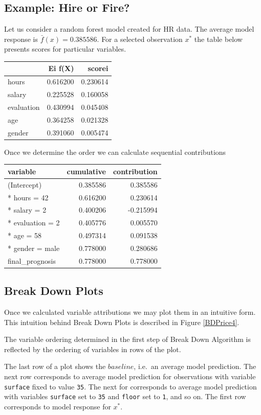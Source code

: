 \documentclass[]{krantz}
\theoremstyle{definition}
\theoremstyle{definition}
\theoremstyle{definition}
\theoremstyle{remark}
\begin{document}
\hypertarget{example-hire-or-fire}{%
\subsection{Example: Hire or Fire?}\label{example-hire-or-fire}}

Let us consider a random forest model created for HR data. The average
model response is \(\bar f(x) = 0.385586\). For a selected observation
\(x^*\) the table below presents scores for particular variables.

\begin{longtable}[]{@{}lrr@{}}
\toprule
& Ei f(X) & scorei\tabularnewline
\midrule
\endhead
hours & 0.616200 & 0.230614\tabularnewline
salary & 0.225528 & 0.160058\tabularnewline
evaluation & 0.430994 & 0.045408\tabularnewline
age & 0.364258 & 0.021328\tabularnewline
gender & 0.391060 & 0.005474\tabularnewline
\bottomrule
\end{longtable}

Once we determine the order we can calculate sequential contributions

\begin{longtable}[]{@{}lrr@{}}
\toprule
variable & cumulative & contribution\tabularnewline
\midrule
\endhead
(Intercept) & 0.385586 & 0.385586\tabularnewline
* hours = 42 & 0.616200 & 0.230614\tabularnewline
* salary = 2 & 0.400206 & -0.215994\tabularnewline
* evaluation = 2 & 0.405776 & 0.005570\tabularnewline
* age = 58 & 0.497314 & 0.091538\tabularnewline
* gender = male & 0.778000 & 0.280686\tabularnewline
final\_prognosis & 0.778000 & 0.778000\tabularnewline
\bottomrule
\end{longtable}

\hypertarget{break-down-plots}{%
\subsection{Break Down Plots}\label{break-down-plots}}

Once we calculated variable attributions we may plot them in an
intuitive form. This intuition behind Break Down Plots is described in
Figure \ref{BDPrice4}.

The variable ordering determined in the first step of Break Down
Algorithm is reflected by the ordering of variables in rows of the plot.

The last row of a plot shows the \(baseline\), i.e.~an average model
prediction. The next row corresponds to average model prediction for
observations with variable \texttt{surface} fixed to value \texttt{35}.
The next for corresponds to average model prediction with variables
\texttt{surface} set to \texttt{35} and \texttt{floor} set to
\texttt{1}, and so on. The first row corresponds to model response for
\(x^*\).
\end{document}
